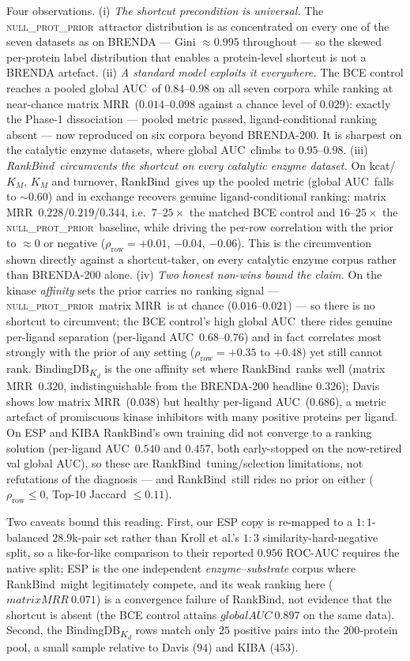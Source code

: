 \documentclass[11pt,a4paper]{article}
\newcommand{\method}{RankBind\xspace}
\newcommand{\nullprior}{\textsc{null\_prot\_prior}\xspace}
\newcommand{\gauc}{global AUC}
\newcommand{\plauc}{per-ligand AUC}
\newcommand{\matmrr}{matrix MRR}
\begin{document}
Four observations. (i) \emph{The shortcut precondition is universal.}
The \nullprior\ attractor distribution is as concentrated on every one
of the seven datasets as on BRENDA --- Gini $\approx 0.995$ throughout
--- so the skewed per-protein label distribution that enables a
protein-level shortcut is not a BRENDA artefact. (ii) \emph{A standard
model exploits it everywhere.} The BCE control reaches a pooled \gauc\
of $0.84$--$0.98$ on all seven corpora while ranking at near-chance
\matmrr\ ($0.014$--$0.098$ against a chance level of $0.029$): exactly
the Phase-1 dissociation --- pooled metric passed, ligand-conditional
ranking absent --- now reproduced on six corpora beyond BRENDA-200. It
is sharpest on the catalytic enzyme datasets, where \gauc\ climbs to
$0.95$--$0.98$. (iii) \emph{\method\ circumvents the shortcut on every
catalytic enzyme dataset.} On kcat/$K_M$, $K_M$ and turnover, \method\
gives up the pooled metric (\gauc\ falls to $\sim\!0.60$) and in
exchange recovers genuine ligand-conditional ranking: \matmrr\
$0.228$/$0.219$/$0.344$, i.e.\ $7$--$25\times$ the matched BCE control
and $16$--$25\times$ the \nullprior\ baseline, while driving the
per-row correlation with the prior to $\approx\!0$ or negative
($\rho_{\text{row}} = +0.01$, $-0.04$, $-0.06$). This is the
circumvention shown directly against a shortcut-taker, on every
catalytic enzyme corpus rather than BRENDA-200 alone. (iv) \emph{Two
honest non-wins bound the claim.} On the kinase \emph{affinity} sets the
prior carries no ranking signal --- \nullprior\ \matmrr\ is at chance
($0.016$--$0.021$) --- so there is no shortcut to circumvent; the BCE
control's high \gauc\ there rides genuine per-ligand separation
(\plauc\ $0.68$--$0.76$) and in fact correlates most strongly with the
prior of any setting ($\rho_{\text{row}} = +0.35$ to $+0.48$) yet still
cannot rank. BindingDB\textsubscript{$K_d$} is the one affinity set
where \method\ ranks well (\matmrr\ $0.320$, indistinguishable from the
BRENDA-200 headline $0.326$); Davis shows low \matmrr\ ($0.038$) but
healthy \plauc\ ($0.686$), a metric artefact of promiscuous kinase
inhibitors with many positive proteins per ligand. On ESP and KIBA
\method's own training did not converge to a ranking solution
(\plauc\ $0.540$ and $0.457$, both early-stopped on the now-retired
val \gauc), so these are \method\ tuning/selection limitations, not
refutations of the diagnosis --- and \method\ still rides no prior on
either ($\rho_{\text{row}} \le 0$, Top-10 Jaccard $\le 0.11$).

Two caveats bound this reading. First, our ESP copy is re-mapped to a
$1{:}1$-balanced $28.9$k-pair set rather than Kroll et al.'s $1{:}3$
similarity-hard-negative split, so a like-for-like comparison to their
reported $0.956$ ROC-AUC requires the native split; ESP is the one
independent \emph{enzyme--substrate} corpus where \method\ might
legitimately compete, and its weak ranking here ($\matmrr\ 0.071$) is a
convergence failure of \method, not evidence that the shortcut is
absent (the BCE control attains $\gauc\ 0.897$ on the same data).
Second, the BindingDB\textsubscript{$K_d$} rows match only $25$
positive pairs into the $200$-protein pool, a small sample relative to
Davis ($94$) and KIBA ($453$).
\end{document}
